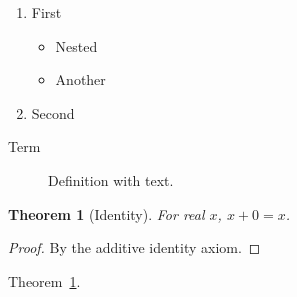 \documentclass{article}
\newtheorem{theorem}{Theorem}[section]
\begin{document}
\begin{enumerate}[label=(\roman*)]\item First\begin{itemize}\item Nested\item Another\end{itemize}\item Second\end{enumerate}
\begin{description}\item[Term] Definition with text.\end{description}
\begin{theorem}[Identity]\label{thm:id}For real $x$, $x+0=x$.\end{theorem}
\begin{proof}By the additive identity axiom.\end{proof}
Theorem~\ref{thm:id}.
\end{document}
